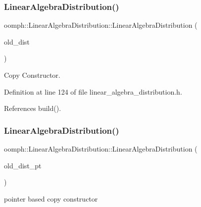 \subsubsection{\texorpdfstring{Linear\+Algebra\+Distribution()}{LinearAlgebraDistribution()}\hspace{0.1cm}{\footnotesize\ttfamily [6/7]}}
{\footnotesize\ttfamily oomph\+::\+Linear\+Algebra\+Distribution\+::\+Linear\+Algebra\+Distribution (\begin{DoxyParamCaption}\item[{const \hyperlink{classoomph_1_1LinearAlgebraDistribution}{Linear\+Algebra\+Distribution} \&}]{old\+\_\+dist }\end{DoxyParamCaption})\hspace{0.3cm}{\ttfamily [inline]}}



Copy Constructor. 



Definition at line 124 of file linear\+\_\+algebra\+\_\+distribution.\+h.



References build().

\mbox{\label{classoomph_1_1LinearAlgebraDistribution_ad7984b69feba8f8797f60639dc962fe4}} 
\subsubsection{\texorpdfstring{Linear\+Algebra\+Distribution()}{LinearAlgebraDistribution()}\hspace{0.1cm}{\footnotesize\ttfamily [7/7]}}
{\footnotesize\ttfamily oomph\+::\+Linear\+Algebra\+Distribution\+::\+Linear\+Algebra\+Distribution (\begin{DoxyParamCaption}\item[{const \hyperlink{classoomph_1_1LinearAlgebraDistribution}{Linear\+Algebra\+Distribution} $\ast$}]{old\+\_\+dist\+\_\+pt }\end{DoxyParamCaption})\hspace{0.3cm}{\ttfamily [inline]}}



pointer based copy constructor 



